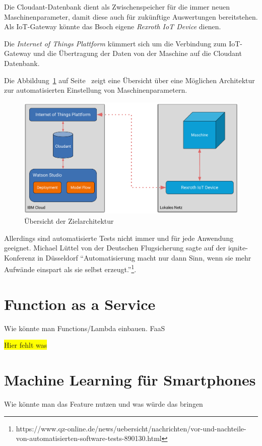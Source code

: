Die Cloudant-Datenbank dient als Zwischenspeicher für die immer neuen Maschinenparameter, damit diese auch für
zukünftige Auswertungen bereitstehen. Als IoT-Gateway könnte das Bsoch eigene \textit{Rexroth IoT Device} dienen.

Die \textit{Internet of Things Plattform} kümmert sich um die Verbindung zum IoT-Gateway und die Übertragung der Daten
von der Maschine auf die Cloudant Datenbank.

Die Abbildung~\ref{fig:ausblick_uebersicht} auf Seite~\pageref{fig:ausblick_uebersicht} zeigt eine Übersicht über eine
Möglichen Architektur zur automatisierten Einstellung von Maschinenparametern.

\begin{figure}[h]
    \centering
    \includegraphics[width=\textwidth]{images/kapitel_6/architektur_uebersicht.pdf}
    \caption{Übersicht der Zielarchitektur}
    \label{fig:ausblick_uebersicht}
\end{figure}

Allerdings sind automatisierte Tests nicht immer und für jede Anwendung geeignet. Michael Lüttel von der Deutschen
Flugsicherung sagte auf der iqnite-Konferenz in Düsseldorf \enquote{Automatisierung macht nur dann Sinn, wenn sie mehr
Aufwände einspart als sie selbst erzeugt.}\footnote{https://www.qz-online.de/news/uebersicht/nachrichten/vor-und-nachteile-von-automatisierten-software-tests-890130.html}.

\section{Function as a Service}
Wie könnte man Functions/Lambda einbauen. FaaS

\colorbox{yellow}{Hier fehlt was}

\section{Machine Learning für Smartphones}
Wie könnte man das Feature nutzen und was würde das bringen

